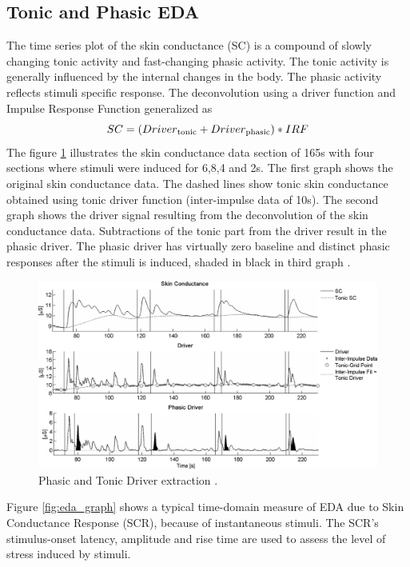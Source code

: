 \subsection{Tonic and Phasic EDA}
\label{sec:tonic_phasic_eda}
The time series plot of the skin conductance (SC) is a compound of slowly changing tonic activity and fast-changing phasic activity. The tonic activity is generally influenced by the internal changes in the body. The phasic activity reflects stimuli specific response. The deconvolution using a driver function and Impulse Response Function generalized as
$$SC = (Driver\textsubscript{tonic} + Driver\textsubscript{phasic})*IRF$$
The figure \ref{fig:phasic_tonic_eda} illustrates the skin conductance data section of 165s with four sections where stimuli were induced for 6,8,4 and 2s. The first graph shows the original skin conductance data. The dashed lines show tonic skin conductance obtained using tonic driver function (inter-impulse data of 10s). The second graph shows the driver signal resulting from the deconvolution of the skin conductance data. Subtractions of the tonic part from the driver result in the phasic driver. The phasic driver has virtually zero baseline and distinct phasic responses after the stimuli is induced, shaded in black in third graph \cite{benedek_continuous_2010}.
\begin{figure}
    \centering
    \includegraphics[width=150mm]{Figures/phasic_tonic_eda.jpg}
    \caption{Phasic and Tonic Driver extraction \cite{benedek_continuous_2010}.}
    \label{fig:phasic_tonic_eda}
\end{figure}


Figure \ref{fig:eda_graph} shows a typical time-domain measure of EDA due to Skin Conductance Response (SCR), because of instantaneous stimuli. The SCR’s stimulus-onset latency, amplitude and rise time are used to assess the level of stress induced by stimuli. 






